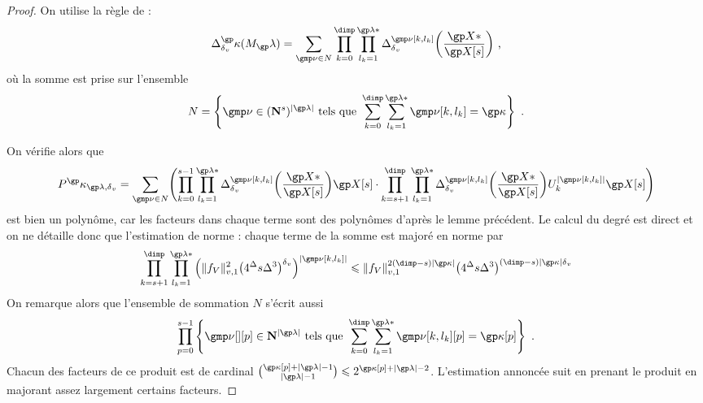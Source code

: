 \begin{proof}
  \newcommand \indl {{ \gmp\nu[\ind, \indi_\ind] }}
  On utilise la règle de  :
  \begin{equation}
    \pdiff^\derp(M_\ip) =
    \sum_{\gmp\nu \in N}
    \prod\indrange
    \prod_{ \indi_\ind = 1 }^{ \ip* }
    \pdiff^\indl \biggl( \frac{ \vp* }{ \vp[\anydim] } \biggr)
    \pmm,
  \end{equation}
  où la somme est prise sur l'ensemble
  \begin{equation}
    N = \left\{
      \gmp\nu \in (\N^\anydim)^{\lgr\ip}
      \text{ tels que }
      \sum\indrange \sum_{\indi_\ind = 1}^{\ip*} \indl = \derp
    \right\}
    \pmm.
  \end{equation}

  On vérifie alors que
  \begin{equation}
    P^\derp_{\ip, \dv}
    =
    \sum_{\gmp\nu \in N}
    \Biggl(
      \prod_{\ind = 0}^{\anydim - 1}
      \prod_{ \indi_\ind = 1 }^{ \ip* }
      \pdiff^\indl \biggl( \frac{ \vp* }{ \vp[\anydim] } \biggr)
      \vp[\anydim]
      \cdot
      \prod_{\ind = \anydim + 1}^{\dimp}
      \prod_{ \indi_\ind = 1 }^{ \ip* }
      \pdiff^\indl \biggl( \frac{ \vp* }{ \vp[\anydim] } \biggr)
      \pden_\ind^{\lgr\indl}
      \vp[\anydim]
    \Biggr)
  \end{equation}
  est bien un polynôme, car les facteurs dans chaque terme sont des polynômes
  d'après le lemme précédent. Le calcul du degré est direct et on ne détaille
  donc que l'estimation de norme : chaque terme de la somme est majoré en
  norme par
  \begin{align}
    \prod_{\ind = \anydim + 1}^{\dimp}
    \prod_{ \indi_\ind = 1 }^{ \ip* }
    \left(
      \nv1{ \chow\anyvar }^2
      \bigl( 4^\anydeg \anydim \anydeg^{3} \bigr)^\dv
    \right)^{\lgr\indl}
    \le
    \nv1{ \chow\anyvar }^{2 (\dimp - \anydim) \lgr\derp}
    \bigl( 4^\anydeg \anydim \anydeg^{3} \bigr)
    ^{(\dimp - \anydim) \lgr\derp \dv}
  \end{align}
  On remarque alors que l'ensemble de sommation \( N \) s'écrit aussi
  \begin{equation}
    \prod_{p = 0}^{\anydim - 1} \left\{
      \gmp\nu[][p] \in \N^{\lgr\ip}
      \text{ tels que }
      \sum\indrange \sum_{\indi_\ind = 1}^{\ip*}
      \gmp\nu[\ind, \indi_\ind][p]
      = \derp[p]
    \right\}
    \pmm.
  \end{equation}
  Chacun des facteurs de ce produit est de cardinal
  \(
    \binom{ \derp[p] + \lgr\ip - 1 }{ \lgr\ip - 1 }
    \le
    2^{ \derp[p] + \lgr\ip - 2 }
  \).
  L'estimation annoncée suit en prenant le produit en majorant assez largement
  certains facteurs.


\end{proof}
